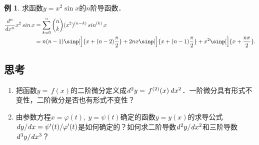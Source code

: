\documentclass[a4paper,punct=CCT]{ctexbook}
\renewcommand*{\siand}{\shortintertext{和}}
\theoremstyle{definition}
\newtheorem*{example*}{例}
\theoremstyle{remark}
\newif\ifshowsolp
\begin{document}
\begin{example*}
  求函数\(y = x^2 \sin x\)的\(n\)阶导函数．
  \begin{equation*}
    \begin{split}
      \dd[^n]{x^n} x^2 \sin x
      &= \sum_{k=0}^n \binom nk (x^2)^{(n-k)} \sin^{(k)}x \\
      &= n(n-1) \sinp[\Big]{x+(n-2)\frac{\pi}{2}}
      + 2nx \sinp[\Big]{x+(n-1)\frac{\pi}{2}}
      + x^2 \sinp[\Big]{x+\frac{n\pi}{2}}.
    \end{split}
  \end{equation*}
\end{example*}

\subsection*{思考}

\begin{enumerate}
\item 把函数\(y = \,f(x)\)的二阶微分定义成\(\mathop{}\!\mathit{d}^2y = \,f^{(2)}(x) \mathop{}\!\mathit{d} x^2\)．一阶微分具有形式不变性，二阶微分是否也有形式不变性？

  \ifshowsolp
  没有．令\(y = \,f(u),\ u = g(x)\)，有
  \begin{gather*}
    \diff_u^2 y
    = f^{(2)}(u) \du^2
    = f^{(2)}\paren[\big]{g(x)} \paren[\big]{g'(x)}{}^2 \dx^2, \\
    \diff_x^2 y
    = \paren[\Big]{\,f^{(2)}\paren[\big]{g(x)} \paren[\big]{g'(x)}^2 + f'\paren[\big]{g(x)}\,g^{(2)}(x)} \dx^2.
  \end{gather*}
  \fi

\item 由参数方程\(x = \varphi(t),\ y = \psi(t)\)确定的函数\(y = y(x)\)的求导公式\(\mathop{}\!\mathit{d} y/\!\mathop{}\!\mathit{d} x = \psi'(t)/\varphi'(t)\)是如何确定的？如何求二阶导数\(\mathop{}\!\mathit{d}^2y/\!\mathop{}\!\mathit{d} x^2\)和三阶导数\(\mathop{}\!\mathit{d}^3y/\!\mathop{}\!\mathit{d} x^3\)？

  \ifshowsolp
  确定的方式多种多样，最简单的方式就是把\(t\)看成\(x\)的函数，然后根据定理~\ref{thm:derivcomp}和~\ref{thm:derivinv}就能得到．使用同样的方法，能得到
  \begin{gather*}
    \dd[^2y]{x^2}
    = \ddt \frac{\psi'}{\varphi'} \cdot \dd[t]x
    = \frac{\psi^{(2)}}{\paren{\varphi'}^2}
    - \frac{\psi'\varphi^{(2)}}{\paren{\varphi'}^3}, \\
    \siand
    \begin{split}
      \ddn[y]x3
      &= \ddt \paren[\Bigg]{\frac{\psi^{(2)}}{\paren{\varphi'}^2}
        - \frac{\psi'\varphi^{(2)}}{\paren{\varphi'}^3}} \cdot \dd[t]x \\
      &= \frac{\psi^{(3)}}{(\varphi')^3}
      - \frac{\psi^{(2)}\varphi^{(2)}
        + \psi'\varphi^{(3)}
        + 2\psi^{(2)}\varphi^{(2)}}{(\varphi')^4}
      + \frac{3\psi'(\varphi^{(2)})^2}{(\varphi')^5}.
    \end{split}
  \end{gather*}
  \fi
\end{enumerate}
\end{document}
